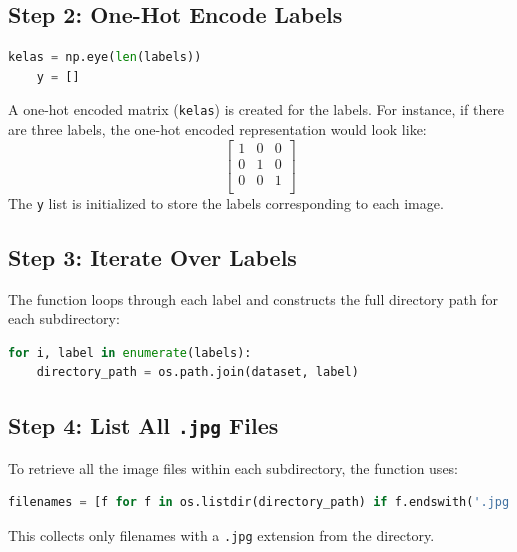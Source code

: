 \subsection*{Step 2: One-Hot Encode Labels}
\begin{lstlisting}[language=Python]
	kelas = np.eye(len(labels))
	y = []
\end{lstlisting}
A one-hot encoded matrix (\texttt{kelas}) is created for the labels. For instance, if there are three labels, the one-hot encoded representation would look like:
\[
\begin{bmatrix}
	1 & 0 & 0 \\
	0 & 1 & 0 \\
	0 & 0 & 1 \\
\end{bmatrix}
\]
The \texttt{y} list is initialized to store the labels corresponding to each image.

\subsection*{Step 3: Iterate Over Labels}
The function loops through each label and constructs the full directory path for each subdirectory:
\begin{lstlisting}[language=Python]
	for i, label in enumerate(labels):
	directory_path = os.path.join(dataset, label)
\end{lstlisting}

\subsection*{Step 4: List All \texttt{.jpg} Files}
To retrieve all the image files within each subdirectory, the function uses:
\begin{lstlisting}[language=Python]
	filenames = [f for f in os.listdir(directory_path) if f.endswith('.jpg')]
\end{lstlisting}
This collects only filenames with a \texttt{.jpg} extension from the directory.

